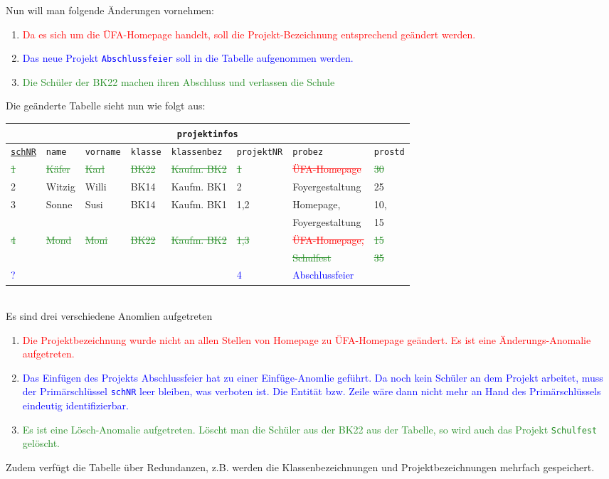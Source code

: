 Nun will man folgende Änderungen vornehmen:
\begin{enumerate}
	\item \textcolor{red}{Da es sich um die ÜFA-Homepage handelt, soll die Projekt-Bezeichnung entsprechend geändert werden.}
	\item \textcolor{blue}{Das neue Projekt \texttt{Abschlussfeier} soll in die Tabelle aufgenommen werden.}
	\item \textcolor{ForestGreen}{Die Schüler der BK22 machen ihren Abschluss und verlassen die Schule}
\end{enumerate}
Die geänderte Tabelle sieht nun wie folgt aus:
\begin{tabular}{llllllll}
	\multicolumn{8}{c}{\lstinline!projektinfos!}\\
	\hline
	\underline{\lstinline!schNR!}&\lstinline!name!&\lstinline!vorname!&\lstinline!klasse!&\lstinline!klassenbez!&\lstinline!projektNR!&\lstinline!probez!&\lstinline!prostd!\\
	\hline
	\textcolor{ForestGreen}{\sout{1}} &
	\textcolor{ForestGreen}{\sout{Käfer}} &
	\textcolor{ForestGreen}{\sout{Karl}} &
	\textcolor{ForestGreen}{\sout{BK22}} &
	\textcolor{ForestGreen}{\sout{Kaufm. BK2}}&
	\textcolor{ForestGreen}{\sout{1}} &
	\textcolor{red}{\sout{ÜFA-Homepage}} &
	\textcolor{ForestGreen}{\sout{30}} \\
	2 &
	Witzig  &
	Willi &
	BK14 &
	Kaufm. BK1&
	2 &
	Foyergestaltung &
	25 \\
	3 &
	Sonne &
	Susi &
	BK14 &
	Kaufm. BK1&
	1,2 &
	Homepage,&
	10,\\
	&&&&&&Foyergestaltung&15\\
	\textcolor{ForestGreen}{\sout{4}}&
	\textcolor{ForestGreen}{\sout{Mond}}&
	\textcolor{ForestGreen}{\sout{Moni}}&
	\textcolor{ForestGreen}{\sout{BK22}}&
	\textcolor{ForestGreen}{\sout{Kaufm. BK2}}&
	\textcolor{ForestGreen}{\sout{1,3}}&
	\textcolor{red}{\sout{ÜFA-Homepage,}}&
	\textcolor{ForestGreen}{\sout{15}}\\
	&&&&&&\textcolor{ForestGreen}{\sout{Schulfest}}&\textcolor{ForestGreen}{\sout{35}}\\
	\textcolor{blue}{?}&
	&
	&
	&
	&
	\textcolor{blue}{4} &
	\textcolor{blue}{Abschlussfeier}&
	\\
\end{tabular}\\
Es sind drei verschiedene Anomlien aufgetreten
\begin{enumerate}
	\item \textcolor{red}{Die Projektbezeichnung wurde nicht an allen Stellen von Homepage zu ÜFA-Homepage geändert. Es ist eine Änderungs-Anomalie aufgetreten.}
	\item \textcolor{blue}{Das Einfügen des Projekts Abschlussfeier hat zu einer Einfüge-Anomlie geführt. Da noch kein Schüler an dem Projekt arbeitet, muss der Primärschlüssel \lstinline!schNR! leer bleiben, was verboten ist. Die Entität bzw. Zeile wäre dann nicht mehr an Hand des Primärschlüssels eindeutig identifizierbar.}
	\item \textcolor{ForestGreen}{Es ist eine Lösch-Anomalie aufgetreten. Löscht man die Schüler aus der BK22 aus der Tabelle, so wird auch das Projekt \texttt{Schulfest} gelöscht.}
\end{enumerate}
Zudem verfügt die Tabelle über Redundanzen, z.B. werden die Klassenbezeichnungen und Projektbezeichnungen mehrfach gespeichert.